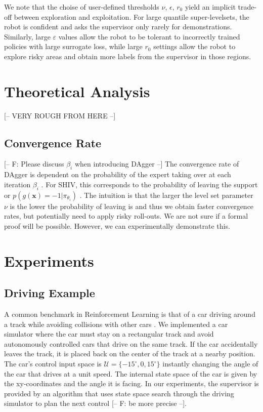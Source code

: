\documentclass[10pt, conference]{ieeeconf}      %
\newcommand{\acro}{SHIV}
\begin{document}
We note that the choise of user-defined thresholds $\nu$, $\epsilon$, $r_0$ yield an implicit trade-off
between exploration and exploitation. For large quantile super-levelsets, the robot is confident and asks the
supervisor only rarely for demonstrations. Similarly, large $\varepsilon$ values allow the robot to be tolerant to
incorrectly trained policies with large surrogate loss, while large $r_0$ settings allow the robot to explore risky
areas and obtain more labels from the supervisor in those regions.


\section{Theoretical Analysis}
{\color{blue} [-- VERY ROUGH FROM HERE --]} 
\subsection{Convergence Rate}
{\color{blue} [-- F: Please discuss $\beta_i$ when introducing DAgger --]} 
The convergence rate of DAgger is dependent on the probability of the expert taking over at each iteration $\beta_i$
\cite{ross2010reduction}. For \acro, this corresponds to the probability of leaving the support or $p(g(\mathbf{x}) =
-1|\pi_{\theta_i})$ . The intuition is that the larger the level set parameter $\nu$ is the lower the probability of
leaving is and thus we obtain faster convergence rates, but potentially need to apply risky roll-outs. We are not sure if a formal proof 
will be possible. However, we can experimentally demonstrate this. 


\section{Experiments}
\subsection{Driving Example}
A common benchmark in Reinforcement Learning is that of a car driving around a track while avoiding collisions with
other cars \cite{argall2009survey}. We implemented a car simulator where the car must stay on a rectangular track and
avoid autonomously controlled cars that drive on the same track. If the car accidentally leaves the track, it is placed
back on the center of the track at a nearby position. The car's control input space is  $\mathcal{U} = \lbrace -15^\circ, 0, 15^\circ \rbrace$
instantly changing the angle of the car that drives at a unit speed. The internal state space of the car is given by the
xy-coordinates and the angle it is facing. In our experiments, the supervisor is provided by an algorithm that uses
state space search through the driving simulator to plan the next control {\color{blue} [-- F: be more precise --]}.
\end{document}
